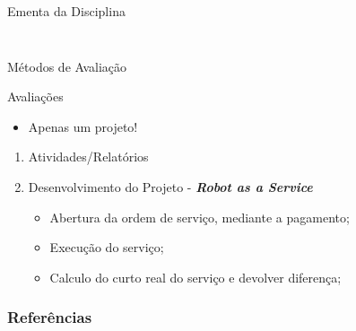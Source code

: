 \documentclass{beamer}
\begin{document}
\begin{frame}[c]{Ementa da Disciplina}
\begin{columns}[c]
\begin{column}{0.5\textwidth}
\begin{figure}
				{\cite{thrun2006probalistic}}
			\end{figure}
		\end{column}
	\end{columns}
\end{frame}


\begin{frame}{Métodos de Avaliação}
	\begin{block}{Avaliações}
		\begin{itemize}
			\item Apenas um projeto!
		\end{itemize}
		\begin{enumerate}
			\item Atividades/Relatórios
			\item Desenvolvimento do Projeto - \textbf{\textit{Robot as a Service}}
			      \begin{itemize}
				      \item Abertura da ordem de serviço, mediante a pagamento;
				      \item Execução do serviço;
				      \item Calculo do curto real do serviço e devolver diferença;
			      \end{itemize}
		\end{enumerate}
	\end{block}
\end{frame}



\begin{frame}[t, allowframebreaks]
	\frametitle{Referências}
	
\end{frame}
\end{document}
